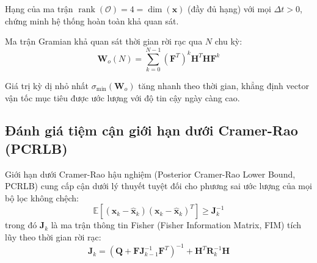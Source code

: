 Hạng của ma trận $\operatorname{rank}(\mathcal{O}) = 4 = \dim(\mathbf{x})$ (đầy đủ hạng) với mọi $\Delta t > 0$, chứng minh hệ thống hoàn toàn khả quan sát.

Ma trận Gramian khả quan sát thời gian rời rạc qua $N$ chu kỳ:
\begin{equation}
\mathbf{W}_o(N) = \sum_{k=0}^{N-1} (\mathbf{F}^T)^k \mathbf{H}^T \mathbf{H} \mathbf{F}^k
\label{eq:observability-gramian}
\end{equation}

\begin{table}[H]
\centering
\caption{Giá trị kỳ dị (Singular Values) của ma trận Gramian khả quan sát theo thời gian}
\label{tab:observability-singular-values}
\end{table}

Giá trị kỳ dị nhỏ nhất $\sigma_{\min}(\mathbf{W}_o)$ tăng nhanh theo thời gian, khẳng định vector vận tốc mục tiêu được ước lượng với độ tin cậy ngày càng cao.

\subsection{Đánh giá tiệm cận giới hạn dưới Cramer-Rao (PCRLB)}

\hspace{0.5cm} Giới hạn dưới Cramer-Rao hậu nghiệm (Posterior Cramer-Rao Lower Bound, PCRLB) cung cấp cận dưới lý thuyết tuyệt đối cho phương sai ước lượng của mọi bộ lọc không chệch:
\begin{equation}
\mathbb{E}\left[ (\mathbf{x}_k - \hat{\mathbf{x}}_k)(\mathbf{x}_k - \hat{\mathbf{x}}_k)^T \right] \ge \mathbf{J}_k^{-1}
\label{eq:pcrlb-inequality}
\end{equation}
trong đó $\mathbf{J}_k$ là ma trận thông tin Fisher (Fisher Information Matrix, FIM) tích lũy theo thời gian rời rạc:
\begin{equation}
\mathbf{J}_k = \left( \mathbf{Q} + \mathbf{F} \mathbf{J}_{k-1}^{-1} \mathbf{F}^T \right)^{-1} + \mathbf{H}^T \mathbf{R}_k^{-1} \mathbf{H}
\label{eq:fisher-information-recursion}
\end{equation}

